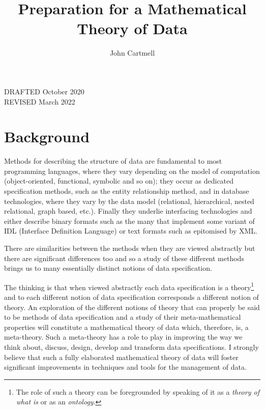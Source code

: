 \documentclass[10pt,a4paper]{article}
\theoremstyle{remark}
\begin{document}
\title{Preparation for a Mathematical Theory of Data}


\author{John Cartmell}

\date{}

\maketitle

\begin{center}
DRAFTED October 2020 \\
REVISED March 2022
\end{center}


\section{Background}
\note
Methods for describing the structure of data are fundamental to most programming languages, 
where they vary depending on the model of computation (object-oriented, functional, symbolic and so on);
they occur as dedicated specification methods, such as the entity relationship method,
and  in database technologies, where they vary by the data model (relational, hierarchical, nested relational,
graph based, etc.). Finally they underlie interfacing technologies and either describe binary formats such as 
the many that implement some variant of IDL (Interface Definition Language) or text formats such as epitomised by XML. 

\note 
There are similarities between the methods when they are viewed abstractly but there are significant differences too and so a study of these different methods brings us to many essentially distinct notions of data specification.

\note
The thinking is that when viewed abstractly each data specification is a 
theory\footnote{The role of such a theory can be foregrounded by speaking of it
 as a \textit {theory of what is} or as an \textit{ontology}.} and  to each different notion of data specification corresponds a different notion of theory. An  exploration of the different notions of theory that can properly be said to be methods of data specification
and a study of their meta-mathematical properties 
 will constitute a mathematical theory of data which, therefore, is, a meta-theory. Such a meta-theory has a role to play in improving  the way we think about, discuss, design, develop and transform data specifications. I strongly believe that such a fully elaborated mathematical theory of data will foster significant improvements in  techniques and tools for the management of data. 
\end{document}
